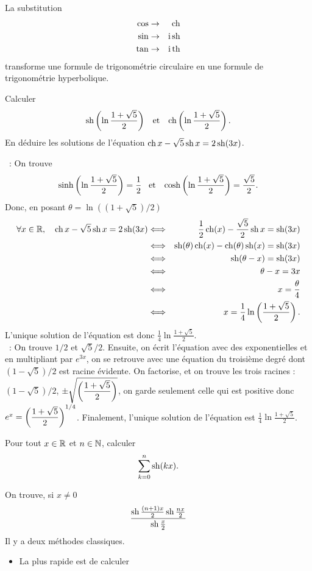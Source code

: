 \documentclass{magnolia}
\begin{document}
\begin{remarqueUnique}
\remarque La substitution
\begin{eqnarray*}
\cos & \to & \operatorname{ch}\\
\sin & \to & {\rm i}\operatorname{sh}\\
\tan & \to & {\rm i}\operatorname{th}
\end{eqnarray*}
transforme une formule de trigonométrie circulaire en une formule de
trigonométrie hyperbolique.
\end{remarqueUnique}

\begin{exos}
\exemple Calculer
  \[\operatorname{sh}\left(\ln\frac{1+\sqrt{5}}{2}\right) \quad\!\text{et}\quad\! 
    \operatorname{ch}\left(\ln\frac{1+\sqrt{5}}{2}\right).\]
  En déduire les solutions de l'équation $\operatorname{ch} x-\sqrt{5}\operatorname{sh} x=2\operatorname{sh}(3x)$.
  \begin{sol}
~:  On trouve
\[\sinh\left(\ln\frac{1+\sqrt{5}}{2}\right)=\frac{1}{2} \quad\!\text{et}\quad\! \cosh\left(\ln\frac{1+\sqrt{5}}{2}\right)=\frac{\sqrt{5}}{2}.\]
Donc, en posant $\theta=\ln((1+\sqrt{5})/2)$
\begin{eqnarray*}
\forall x\in\mathbb{R},\quad \operatorname{ch} x-\sqrt{5}\operatorname{sh} x=2\operatorname{sh}(3x)
&\Longleftrightarrow& \frac{1}{2}\operatorname{ch}(x)-\frac{\sqrt{5}}{2}\operatorname{sh} x=\operatorname{sh}(3x)\\
&\Longleftrightarrow& \operatorname{sh}(\theta)\operatorname{ch}(x)-\operatorname{ch}(\theta)\operatorname{sh}(x)=\operatorname{sh}(3x)\\
&\Longleftrightarrow& \operatorname{sh}(\theta-x)=\operatorname{sh}(3x)\\
&\Longleftrightarrow& \theta-x=3x\\
&\Longleftrightarrow& x=\frac{\theta}{4}\\
&\Longleftrightarrow& x=\frac{1}{4}\ln\left(\frac{1+\sqrt{5}}{2}\right).
\end{eqnarray*}
L'unique solution de l'équation est donc $\frac{1}{4}\ln\frac{1+\sqrt{5}}{2}$.\\
~: On trouve $1/2$ et $\sqrt{5}/2$. Ensuite, on écrit l'équation avec des exponentielles et en multipliant par $e^{3x}$, on se retrouve avec une équation du troisième degré dont $(1-\sqrt{5})/2$ est racine évidente. On factorise, et on trouve les trois racines : $(1-\sqrt{5})/2$, $\pm \sqrt{\left(\dfrac{1+\sqrt{5}}{2}\right)}$, on garde seulement celle qui est positive donc $e^x=\left(\dfrac{1+\sqrt{5}}{2}\right)^{1/4}$. Finalement, l'unique solution de l'équation est
  $\frac{1}{4}\ln\frac{1+\sqrt{5}}{2}$.
  \end{sol}
\exemple Pour tout $x\in\mathbb{R}$ et $n\in\mathbb{N}$, calculer
  \[\sum_{k=0}^n \operatorname{sh}(kx).\]
  \begin{sol}
  On trouve, si $x\neq 0$
  \[\frac{\operatorname{sh}\frac{(n+1)x}{2}\operatorname{sh}\frac{nx}{2}}{\operatorname{sh}\frac{x}{2}}\]
  Il y a deux méthodes classiques.
  \begin{itemize}
\item La plus rapide est de calculer

\end{itemize}
\end{sol}
\end{exos}
\end{document}
